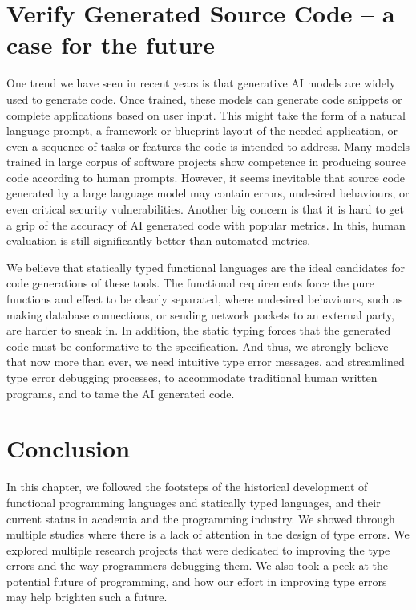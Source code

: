 \section{Verify Generated Source Code -- a case for the future}

One trend we have seen in recent years is that generative AI models are widely used to generate code. Once trained, these models can generate code snippets or complete applications based on user input. This might take the form of a natural language prompt, a framework or blueprint layout of the needed application, or even a sequence of tasks or features the code is intended to address. Many models trained in large corpus of software projects show competence in producing source code according to human prompts. However, it seems inevitable that source code generated by a large language model may contain errors, undesired behaviours, or even critical security vulnerabilities. Another big concern is that it is hard to get a grip of the accuracy of AI generated code with popular metrics. In this, human evaluation is still significantly better than automated metrics.


 We believe that statically typed functional languages are the ideal candidates for code generations of these tools. The functional requirements force the pure functions and effect to be clearly separated, where undesired behaviours, such as making database connections, or sending network packets to an external party, are harder to sneak in. In addition, the static typing forces that the generated code must be conformative to the specification. And thus, we strongly believe that now more than ever, we need intuitive type error messages, and streamlined type error debugging processes, to accommodate traditional human written programs, and to tame the AI generated code.


 \section{Conclusion}
 In this chapter, we followed the footsteps of the historical development of functional programming languages and statically typed languages, and their current status in academia and the programming industry. We showed through multiple studies where there is a lack of attention in the design of type errors. We explored multiple research projects that were dedicated to improving the type errors and the way programmers debugging them. We also took a peek at the potential future of programming, and how our effort in improving type errors may help brighten such a future.